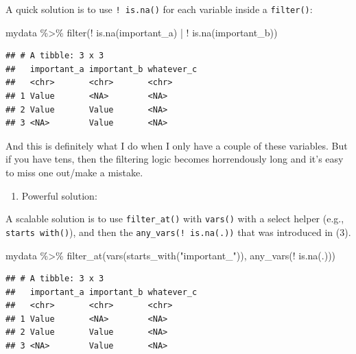 \documentclass[
]{book}
\newenvironment{Shaded}{\begin{snugshade}}{\end{snugshade}}
\newcommand{\FunctionTok}[1]{\textcolor[rgb]{0.00,0.00,0.00}{#1}}
\newcommand{\NormalTok}[1]{#1}
\newcommand{\SpecialCharTok}[1]{\textcolor[rgb]{0.00,0.00,0.00}{#1}}
\newcommand{\StringTok}[1]{\textcolor[rgb]{0.31,0.60,0.02}{#1}}
\providecommand{\tightlist}{%
  \setlength{\itemsep}{0pt}\setlength{\parskip}{0pt}}
\begin{document}
A quick solution is to use \texttt{!\ is.na()} for each variable inside a \texttt{filter()}:

\begin{Shaded}
\begin{Highlighting}[]
\NormalTok{mydata }\SpecialCharTok{\%\textgreater{}\%} 
  \FunctionTok{filter}\NormalTok{(}\SpecialCharTok{!} \FunctionTok{is.na}\NormalTok{(important\_a) }\SpecialCharTok{|} \SpecialCharTok{!} \FunctionTok{is.na}\NormalTok{(important\_b))}
\end{Highlighting}
\end{Shaded}

\begin{verbatim}
## # A tibble: 3 x 3
##   important_a important_b whatever_c
##   <chr>       <chr>       <chr>     
## 1 Value       <NA>        <NA>      
## 2 Value       Value       <NA>      
## 3 <NA>        Value       <NA>
\end{verbatim}

And this is definitely what I do when I only have a couple of these variables. But if you have tens, then the filtering logic becomes horrendously long and it's easy to miss one out/make a mistake.

\begin{enumerate}
\def\labelenumi{(\arabic{enumi})}
\setcounter{enumi}{4}
\tightlist
\item
  Powerful solution:
\end{enumerate}

A scalable solution is to use \texttt{filter\_at()} with \texttt{vars()} with a select helper (e.g., \texttt{starts\ with()}), and then the \texttt{any\_vars(!\ is.na(.))} that was introduced in (3).

\begin{Shaded}
\begin{Highlighting}[]
\NormalTok{mydata }\SpecialCharTok{\%\textgreater{}\%} 
  \FunctionTok{filter\_at}\NormalTok{(}\FunctionTok{vars}\NormalTok{(}\FunctionTok{starts\_with}\NormalTok{(}\StringTok{"important\_"}\NormalTok{)), }\FunctionTok{any\_vars}\NormalTok{(}\SpecialCharTok{!} \FunctionTok{is.na}\NormalTok{(.)))}
\end{Highlighting}
\end{Shaded}

\begin{verbatim}
## # A tibble: 3 x 3
##   important_a important_b whatever_c
##   <chr>       <chr>       <chr>     
## 1 Value       <NA>        <NA>      
## 2 Value       Value       <NA>      
## 3 <NA>        Value       <NA>
\end{verbatim}
\end{document}
